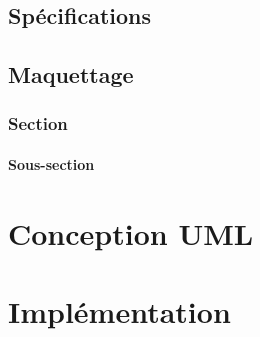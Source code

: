 \documentclass[]{report}
\begin{document}
\chapter{Spécifications}
\chapter{Maquettage}
\section{Section}
\subsection{Sous-section}

\part{Conception UML}

\part{Implémentation}
\end{document}
